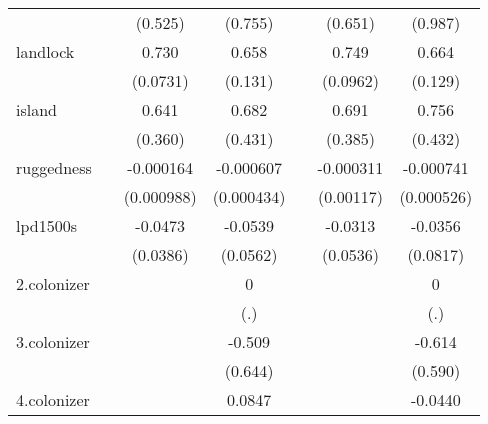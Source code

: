 {\begin{tabular}{l*{6}{c}}
            &                     &     (0.525)         &     (0.755)         &                     &     (0.651)         &     (0.987)         \\
[1em]
landlock    &                     &       0.730\sym{***}&       0.658\sym{***}&                     &       0.749\sym{***}&       0.664\sym{***}\\
            &                     &    (0.0731)         &     (0.131)         &                     &    (0.0962)         &     (0.129)         \\
[1em]
island      &                     &       0.641         &       0.682         &                     &       0.691         &       0.756         \\
            &                     &     (0.360)         &     (0.431)         &                     &     (0.385)         &     (0.432)         \\
[1em]
ruggedness  &                     &   -0.000164         &   -0.000607         &                     &   -0.000311         &   -0.000741         \\
            &                     &  (0.000988)         &  (0.000434)         &                     &   (0.00117)         &  (0.000526)         \\
[1em]
lpd1500s    &                     &     -0.0473         &     -0.0539         &                     &     -0.0313         &     -0.0356         \\
            &                     &    (0.0386)         &    (0.0562)         &                     &    (0.0536)         &    (0.0817)         \\
[1em]
2.colonizer &                     &                     &           0         &                     &                     &           0         \\
            &                     &                     &         (.)         &                     &                     &         (.)         \\
[1em]
3.colonizer &                     &                     &      -0.509         &                     &                     &      -0.614         \\
            &                     &                     &     (0.644)         &                     &                     &     (0.590)         \\
[1em]
4.colonizer &                     &                     &      0.0847         &                     &                     &     -0.0440         \\

\end{tabular}}
